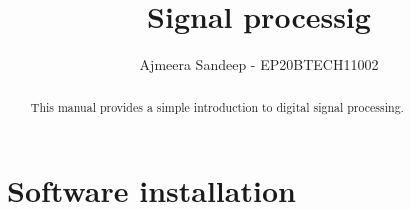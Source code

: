 \documentclass[journal,12pt,twocolumn]{IEEEtran}
\renewcommand\thesection{\arabic{section}}
\begin{document}
\let\StandardTheFigure\thefigure
\renewcommand{\thefigure}{\thesection}



\makeatletter
{}
\makeatother

\let\StandardTheFigure\thefigure
\let\StandardTheTable\thetable
\let\vec\mathbf
{}

\vspace{3cm}


\title{%
	Signal processig
}

%
%
%

\author{Ajmeera Sandeep - EP20BTECH11002}
\maketitle

\tableofcontents

\bigskip

\renewcommand{\thefigure}{\theenumi}
\renewcommand{\thetable}{\theenumi}

\begin{abstract}
This manual provides a simple introduction to digital signal processing.
\end{abstract}
\section{Software installation}
\end{document}

